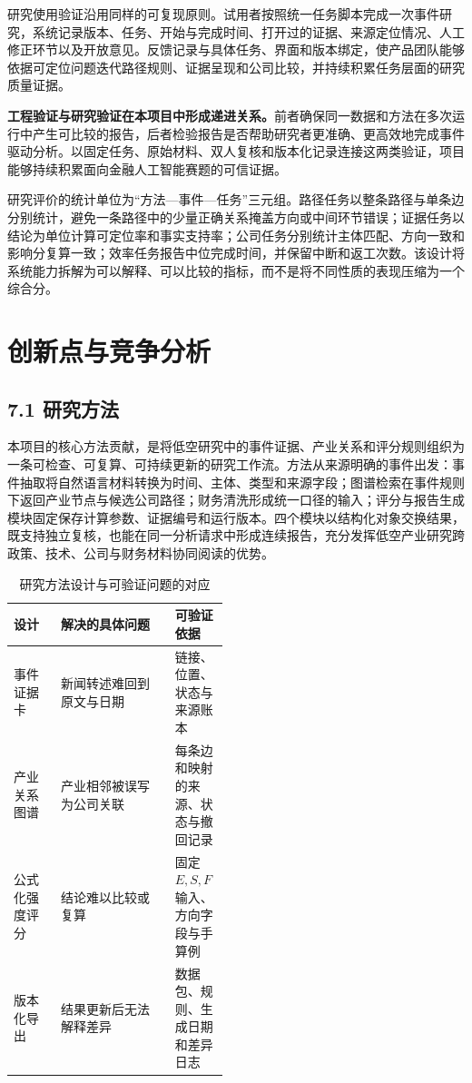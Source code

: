 研究使用验证沿用同样的可复现原则。试用者按照统一任务脚本完成一次事件研究，系统记录版本、任务、开始与完成时间、打开过的证据、来源定位情况、人工修正环节以及开放意见。反馈记录与具体任务、界面和版本绑定，使产品团队能够依据可定位问题迭代路径规则、证据呈现和公司比较，并持续积累任务层面的研究质量证据。

\noindent\textbf{工程验证与研究验证在本项目中形成递进关系。}前者确保同一数据和方法在多次运行中产生可比较的报告，后者检验报告是否帮助研究者更准确、更高效地完成事件驱动分析。以固定任务、原始材料、双人复核和版本化记录连接这两类验证，项目能够持续积累面向金融人工智能赛题的可信证据。

研究评价的统计单位为“方法—事件—任务”三元组。路径任务以整条路径与单条边分别统计，避免一条路径中的少量正确关系掩盖方向或中间环节错误；证据任务以结论为单位计算可定位率和事实支持率；公司任务分别统计主体匹配、方向一致和影响分复算一致；效率任务报告中位完成时间，并保留中断和返工次数。该设计将系统能力拆解为可以解释、可以比较的指标，而不是将不同性质的表现压缩为一个综合分。


\section{创新点与竞争分析}
\subsection*{7.1 研究方法}\label{page:33}

本项目的核心方法贡献，是将低空研究中的事件证据、产业关系和评分规则组织为一条可检查、可复算、可持续更新的研究工作流。方法从来源明确的事件出发：事件抽取将自然语言材料转换为时间、主体、类型和来源字段；图谱检索在事件规则下返回产业节点与候选公司路径；财务清洗形成统一口径的输入；评分与报告生成模块固定保存计算参数、证据编号和运行版本。四个模块以结构化对象交换结果，既支持独立复核，也能在同一分析请求中形成连续报告，充分发挥低空产业研究跨政策、技术、公司与财务材料协同阅读的优势。

\begin{table}[!htbp]
\centering
\caption{研究方法设计与可验证问题的对应}
\label{tab:wty-method-improvement}
\small
\begin{tabularx}{\linewidth}{p{0.22\linewidth}X p{0.25\linewidth}}
\toprule
设计 & 解决的具体问题 & 可验证依据 \\
\midrule
事件证据卡 & 新闻转述难回到原文与日期 & 链接、位置、状态与来源账本 \\
产业关系图谱 & 产业相邻被误写为公司关联 & 每条边和映射的来源、状态与撤回记录 \\
公式化强度评分 & 结论难以比较或复算 & 固定 $E,S,F$ 输入、方向字段与手算例 \\
版本化导出 & 结果更新后无法解释差异 & 数据包、规则、生成日期和差异日志 \\
\bottomrule
\end{tabularx}
\end{table}

